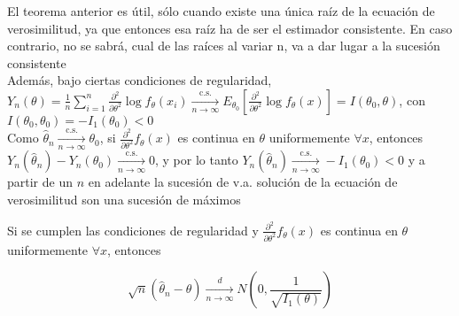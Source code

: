\begin{observación}
El teorema anterior es útil, sólo cuando existe una única raíz de la ecuación de verosimilitud, ya que entonces esa raíz ha de ser el estimador consistente. En caso contrario, no se sabrá, cual de las raíces al variar n, va a dar lugar a la sucesión consistente\\
Además, bajo ciertas condiciones de regularidad,\\
$Y_{n}(\theta)=\frac{1}{n} \sum_{i=1}^{n} \frac{\partial^{2}}{\partial \theta^{2}} \log f_{\theta}\left(x_{i}\right) \xrightarrow[n \rightarrow \infty]{\text { c.s. }} E_{\theta_{0}}\left[\frac{\partial^{2}}{\partial \theta^{2}} \log f_{\theta}(x)\right]=I\left(\theta_{0}, \theta\right)$, con $I\left(\theta_{0}, \theta_{0}\right)=-I_{1}\left(\theta_{0}\right)<0$\\
Como $\hat{\theta}_{n} \xrightarrow[n \rightarrow \infty]{\text { c.s. }} \theta_{0}$, si $\frac{\partial^{2}}{\partial \theta^{2}} f_{\theta}(x)$ es continua en $\theta$ uniformemente $\forall x$, entonces $Y_{n}\left(\hat{\theta}_{n}\right)-Y_{n}\left(\theta_{0}\right) \xrightarrow[n \rightarrow \infty]{\text { c.s. }} 0$, y por lo tanto $Y_{n}\left(\hat{\theta}_{n}\right) \xrightarrow[n \rightarrow \infty]{\text { c.s. }}-I_{1}\left(\theta_{0}\right)<0$ y a partir de un $n$ en adelante la sucesión de v.a. solución de la ecuación de verosimilitud son una sucesión de máximos
\end{observación}

\begin{teorema} 
  Si se cumplen las condiciones de regularidad y $\frac{\partial^{2}}{\partial \theta^{2}} f_{\theta}(x)$ es continua en $\theta$ uniformemente $\forall x$, entonces

  $$
    \sqrt{n}\left(\hat{\theta}_{n}-\theta\right) \underset{n \rightarrow \infty}{\stackrel{d}{\longrightarrow}} N\left(0, \frac{1}{\sqrt{I_{1}(\theta)}}\right)
  $$

\end{teorema}


